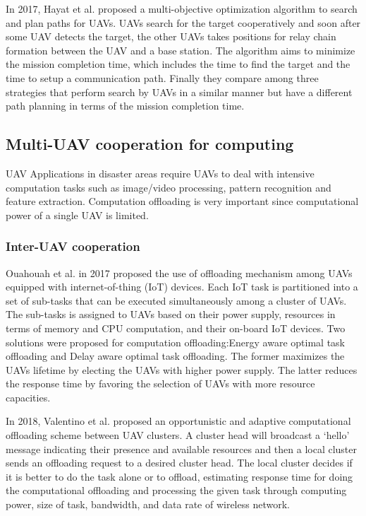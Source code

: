 \documentclass{ieeeaccess}
\begin{document}
In 2017, Hayat et al. proposed a multi-objective optimization algorithm to search and plan paths for UAVs\cite{Hayat 2017}.
UAVs search for the target cooperatively and soon after some UAV detects the target, the other UAVs takes positions for relay chain formation between the UAV and a base station.
The algorithm aims to minimize the mission completion time, which includes the time to find the target and the time to setup a communication path.
Finally they compare among three strategies that perform search by UAVs in a similar manner but have a different path planning in terms of the mission completion time.

\subsection{Multi-UAV cooperation for computing}\label{compute}
UAV Applications in disaster areas require UAVs to deal with intensive computation tasks such as image/video processing, pattern recognition and feature extraction. 
Computation offloading is very important since computational power of a single UAV is limited.
\subsubsection{Inter-UAV cooperation}
Ouahouah et al. in 2017 proposed the use of offloading mechanism among UAVs equipped with internet-of-thing (IoT) devices\cite{Ouahouah2017}.
Each IoT task is partitioned into a set of sub-tasks that can be executed simultaneously among a cluster of UAVs.
The sub-tasks is assigned to UAVs based on their power supply, resources in terms of memory and CPU computation, and their on-board IoT devices.
Two solutions were proposed for computation offloading:Energy aware optimal task offloading and Delay aware optimal task offloading.
The former maximizes the UAVs lifetime by electing the UAVs with higher power supply.
The latter reduces the response time by favoring the selection of UAVs with more resource capacities.

In 2018, Valentino et al. proposed an opportunistic and adaptive computational offloading scheme between UAV clusters\cite{Valentino2018}.
A cluster head will broadcast a ‘hello' message indicating their presence and available resources and then a local cluster sends an offloading request to a desired cluster head.
The local cluster decides if it is better to do the task alone or to offload, estimating response time for doing the computational offloading and processing the given task through computing power, size of task, bandwidth, and data rate of wireless network.
\end{document}
